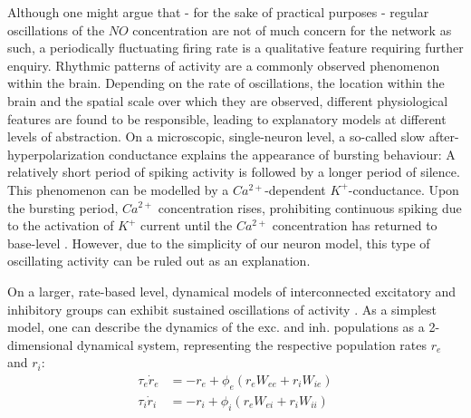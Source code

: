 \documentclass[10pt,a4paper]{article}
\begin{document}
Although one might argue that - for the sake of practical purposes - regular oscillations of the $NO$ concentration are not of much concern for the network as such, a periodically fluctuating firing rate is a qualitative feature requiring further enquiry. Rhythmic patterns of activity are a commonly observed phenomenon within the brain. Depending on the rate of oscillations, the location within the brain and the spatial scale over which they are observed, different physiological features are found to be responsible, leading to explanatory models at different levels of abstraction. On a microscopic, single-neuron level, a so-called slow after-hyperpolarization conductance explains the appearance of bursting behaviour: A relatively short period of spiking activity is followed by a longer period of silence. This phenomenon can be modelled by a $Ca^{2+}$-dependent $K^{+}$-conductance. Upon the bursting period, $Ca^{2+}$ concentration rises, prohibiting continuous spiking due to the activation of $K^{+}$  current until the $Ca^{2+}$ concentration has returned to base-level \cite[p.~203-207]{Theor_Neur_Dayan}. However, due to the simplicity of our neuron model, this type of oscillating activity can be ruled out as an explanation.

On a larger, rate-based level, dynamical models of interconnected excitatory and inhibitory groups can exhibit sustained oscillations of activity \cite[p.~270]{Theor_Neur_Dayan}. As a simplest model, one can describe the dynamics of the exc. and inh. populations as a 2-dimensional dynamical system, representing the respective population rates $r_e$ and $r_i$:
\begin{align}
\tau_e \dot{r}_e  &= -r_e + \phi_e(r_e W_{ee} + r_i W_{ie}) \label{2d-exc_inh_rate_1} \\
\tau_i \dot{r}_i  &= -r_i + \phi_i(r_e W_{ei} + r_i W_{ii}) \label{2d-exc_inh_rate_2}
\end{align}
\end{document}
